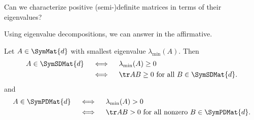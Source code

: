 

Can we characterize positive (semi-)definite matrices in terms of their eigenvalues?


Using eigenvalue decompositions, we can answer in the affirmative.

\begin{proposition}
  Let $A \in \SymMat{d}$ with smallest eigenvalue $\lambda_{\min}(A)$.
  Then
  \[
    \begin{aligned}
      A \in \SymSDMat{d}  \quad &\iff \quad \lambda_{\min}(A) \geq 0 \\ \quad &\iff \quad \tr AB \geq 0 \text{ for all } B \in \SymSDMat{d}.
    \end{aligned}
  \]
  and
  \[
    \begin{aligned}
      A \in \SymPDMat{d} \quad &\iff \quad \lambda_{\min}(A) > 0 \\ \quad &\iff \quad \tr AB > 0 \text{ for all nonzero } B \in \SymPDMat{d}.
    \end{aligned}
  \]
\end{proposition}

\blankpage
